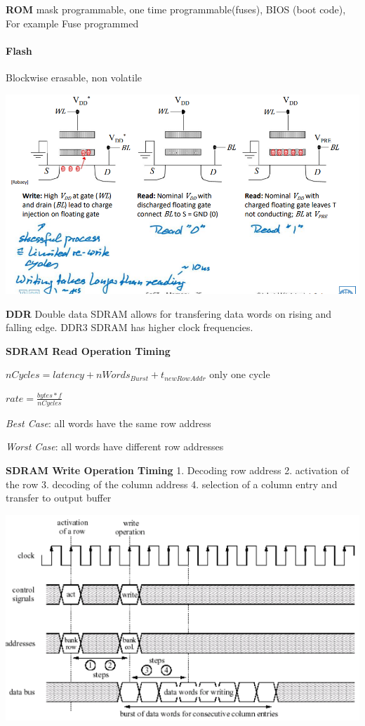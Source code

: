 \documentclass[english]{latex4ei/latex4ei_sheet}
\begin{document}
\textbf{ROM} mask programmable, one time programmable(fuses), BIOS (boot code), For example Fuse programmed

\paragraph{Flash}
Blockwise erasable, non volatile

\begin{center}
  \centering
  \includegraphics[width=0.8\linewidth]{assets/Flash.png}
  \label{fig:flash}
\end{center}

\textbf{DDR} Double data SDRAM allows for transfering data words on rising and falling edge. DDR3 SDRAM has higher clock frequencies.

\textbf{SDRAM Read Operation Timing}

$nCycles = latency + nWords_{Burst} + t_{newRowAddr}$ \quad only one cycle

$rate = \frac{bytes * f}{nCycles}$

\textit{Best Case}: all words have the same row address

\textit{Worst Case}: all words have different row addresses

\textbf{SDRAM Write Operation Timing}
1. Decoding row address 2. activation of the row 3. decoding of the column address 4. selection of a column entry and transfer to output buffer
\begin{center}
	\includegraphics[width=\linewidth]{images//5.Memory/SDRAMWrite.png}
\end{center}
\end{document}

